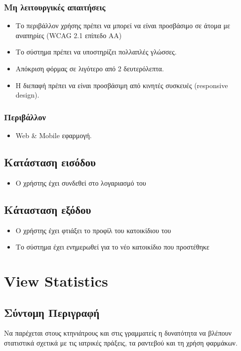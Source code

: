 \documentclass[12pt,a4paper,twoside]{book}
\begin{document}
\subsubsection{Μη λειτουργικές απαιτήσεις}
\begin{itemize}
  \item Το περιβάλλον χρήσης πρέπει να μπορεί να  είναι προσβάσιμο σε  άτομα με αναπηρίες (WCAG 2.1 επίπεδο AA) %
  \item Το σύστημα πρέπει να υποστηρίζει πολλαπλές γλώσσες.
  \item Απόκριση φόρμας σε λιγότερο από 2 δευτερόλεπτα. %
  \item Η διεπαφή πρέπει να είναι προσβάσιμη από κινητές συσκευές (responsive design). %
\end{itemize}

\subsubsection{Περιβάλλον}
\begin{itemize}
  \item Web \& Mobile εφαρμογή.
\end{itemize}

\subsection{Κατάσταση εισόδου} %
\begin{itemize}
  \item Ο χρήστης έχει συνδεθεί στο λογαριασμό του %
\end{itemize}

\subsection{Κάτασταση εξόδου} %
\begin{itemize}
  \item Ο χρήστης έχει φτιάξει το προφίλ του κατοικίδιου του %
  \item Το σύστημα έχει ενημερωθεί για το νέο κατοικίδιο που προστέθηκε %
\end{itemize}

\section{View Statistics} %

\subsection{Σύντομη Περιγραφή}
Να παρέχεται στους κτηνιάτρους και στις γραμματείς η δυνατότητα να βλέπουν στατιστικά σχετικά με τις ιατρικές πράξεις, τα ραντεβού και τη χρήση φαρμάκων. %
\end{document}
